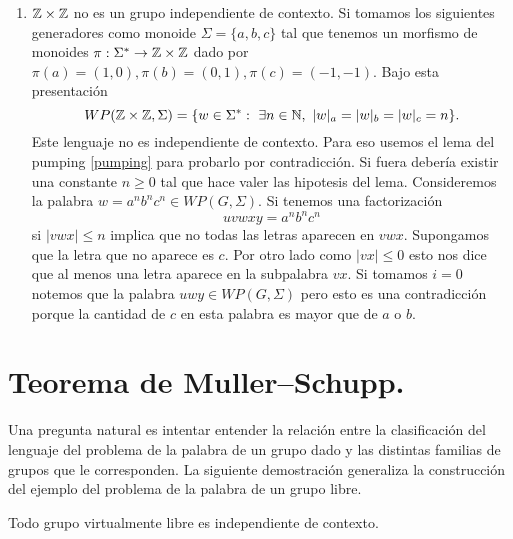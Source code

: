 \documentclass[tesis.tex]{subfiles}
\begin{document}
\begin{ej}
\begin{enumerate}[E1.]
		
		\item 	$\mathbb{Z} \times \mathbb{Z}$ no es un grupo independiente de contexto.
		Si tomamos los siguientes generadores como monoide $\Sigma = \{ a,b,c \}$ tal que tenemos un morfismo de monoides $\pi: \Sigma^* \to \mathbb{Z} \times \mathbb{Z}$ dado por $\pi(a)=(1,0), \pi(b)=(0,1), \pi(c)=(-1,-1)$.
		Bajo esta presentación 
		\[
		WP(\mathbb{Z} \times \mathbb{Z}, \Sigma) = \{ w \in \Sigma^*  : \ \exists n \in \mathbb{N}, \ |w|_a = |w|_b = |w|_c = n \}.
		\]
		Este lenguaje no es independiente de contexto.
		Para eso usemos el lema del pumping \ref{pumping} para probarlo por contradicción.
		Si fuera \ic debería existir una constante $n \ge 0$ tal que hace valer las hipotesis del lema.
		Consideremos la palabra $w = a^n b^n c^n \in WP(G, \Sigma)$.
		Si tenemos una factorización 
		\[
		uvwxy = a^nb^nc^n
		\]
		si $|vwx| \le n$ implica que no todas las letras aparecen en $vwx$.
		Supongamos que la letra que no aparece es $c$.
		Por otro lado como $|vx| \le 0$ esto nos dice que al menos una letra aparece en la subpalabra $vx$.
		Si tomamos $i=0$ notemos que la palabra $uwy \in WP(G,\Sigma)$ pero esto es una contradicción porque la cantidad de $c$ en esta palabra es mayor que de $a$ o $b$.
	\end{enumerate}
\end{ej}

\section{Teorema de Muller--Schupp.}


Una pregunta natural es intentar entender la relación entre la clasificación del lenguaje del problema de la palabra de un grupo dado y las distintas familias de grupos que le corresponden. 
La siguiente demostración generaliza la construcción del ejemplo del problema de la palabra de un grupo libre.


\begin{teo}\cite{muller1983groups}
	Todo grupo virtualmente libre es independiente de contexto.
\end{teo}
\end{document}
